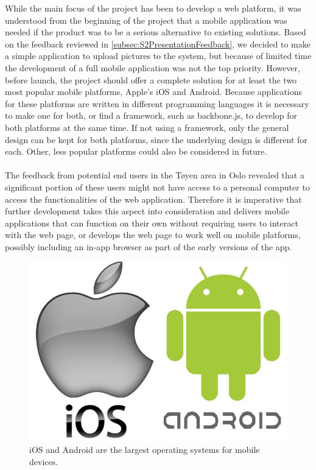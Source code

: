 While the main focus of the project has been to develop a web platform, it was understood from the beginning of the project that a mobile application was needed if the product was to be a serious alternative to existing solutions. Based on the feedback reviewed in \ref{subsec:S2PresentationFeedback}, we decided to make a simple application to upload pictures to the system, but because of limited time the development of a full mobile application was not the top priority. However, before launch,  the project should offer a complete solution for at least the two most popular mobile platforms, Apple's iOS and Android. Because applications for these platforms are written in different programming languages it is necessary to make one for both, or find a framework, such as backbone.js, to develop for both platforms at the same time. If not using a framework, only the general design can be kept for both platforms, since the underlying design is different for each. Other, less popular platforms could also be considered in future.
\paragraph{} The feedback from potential end users in the T{\o}yen area in Oslo revealed that a significant portion of these users might not have access to a personal computer to access the functionalities of the web application. Therefore it is imperative that further development takes this aspect into consideration and delivers mobile applications that can function on their own without requiring users to interact with the web page, or develops the web page to work well on mobile platforms, possibly including an in-app browser as part of the early versions of the app.

\begin{figure}[ht!]
  \centering
  \includegraphics[width=\linewidth]{./FurtherWork/img/iOSAndroid}
  \caption{iOS and Android are the largest operating systems for mobile devices.}
  \label{fig:FurtherIOSAndroidLogo}
\end{figure}

